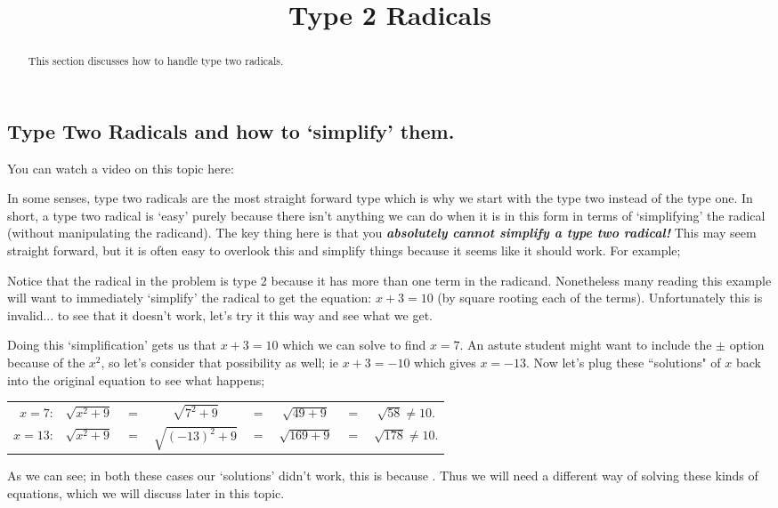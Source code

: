 \documentclass{ximera}
\title{Type 2 Radicals}
\begin{document}
\begin{abstract}
    This section discusses how to handle type two radicals.
\end{abstract}
\maketitle

\subsection*{Type Two Radicals and how to `simplify' them.}
    You can watch a video on this topic here:
    

    In some senses, type two radicals are the most straight forward type which is why we start with the type two instead of the type one. In short, a type two radical is `easy' purely because there isn't anything we can do when it is in this form in terms of `simplifying' the radical (without manipulating the radicand). The key thing here is that you \textit{\textbf{absolutely cannot simplify a type two radical!}} This may seem straight forward, but it is often easy to overlook this and simplify things because it seems like it should work. For example;

    \begin{example}[Find values of $x$ so that $\sqrt{x^2 + 9} = 10$]%
        Notice that the radical in the problem is type 2 because it has more than one term in the radicand. Nonetheless many reading this example will want to immediately `simplify' the radical to get the equation: $x + 3 = 10$ (by square rooting each of the terms). Unfortunately this is invalid... to see that it doesn't work, let's try it this way and see what we get.

        Doing this `simplification' gets us that $x + 3 = 10$ which we can solve to find $x = 7$. An astute student might want to include the $\pm$ option because of the $x^2$, so let's consider that possibility as well; ie $x + 3 = - 10$ which gives $x = -13$. Now let's plug these ``solutions" of $x$ back into the original equation to see what happens;
        
        \begin{tabular}{rccccccc}
            $x=7$:  & $\sqrt{x^2 + 9}$ & $=$ & $\sqrt{7^2 + 9}$     & $=$ & $\sqrt{49 + 9}$     & $=$ & $\sqrt{58} \neq 10$.\\
            $x=13$: & $\sqrt{x^2 + 9}$ & $=$ & $\sqrt{(-13)^2 + 9}$ & $=$ & $\sqrt{169 + 9}$    & $=$ & $\sqrt{178} \neq 10$.
        \end{tabular}

        As we can see; in both these cases our `solutions' didn't work, this is because . Thus we will need a different way of solving these kinds of equations, which we will discuss later in this topic.
    \end{example}%
\end{document}
